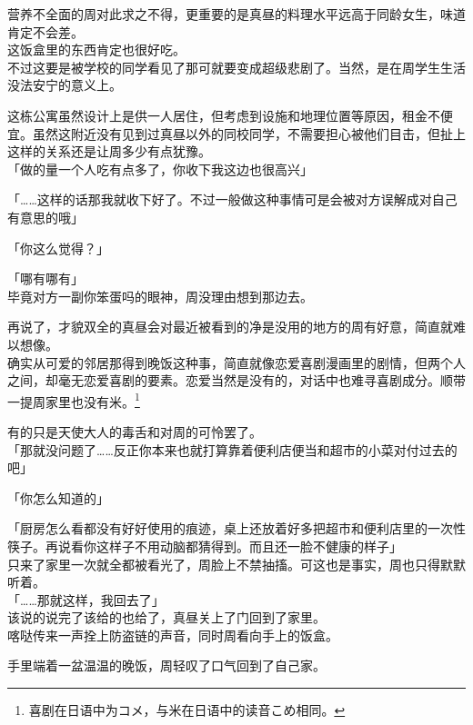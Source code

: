 营养不全面的周对此求之不得，更重要的是真昼的料理水平远高于同龄女生，味道肯定不会差。\\

这饭盒里的东西肯定也很好吃。\\

不过这要是被学校的同学看见了那可就要变成超级悲剧了。当然，是在周学生生活没法安宁的意义上。

这栋公寓虽然设计上是供一人居住，但考虑到设施和地理位置等原因，租金不便宜。虽然这附近没有见到过真昼以外的同校同学，不需要担心被他们目击，但扯上这样的关系还是让周多少有点犹豫。\\

「做的量一个人吃有点多了，你收下我这边也很高兴」

「……这样的话那我就收下好了。不过一般做这种事情可是会被对方误解成对自己有意思的哦」

「你这么觉得？」

「哪有哪有」\\

毕竟对方一副你笨蛋吗的眼神，周没理由想到那边去。

再说了，才貌双全的真昼会对最近被看到的净是没用的地方的周有好意，简直就难以想像。\\

确实从可爱的邻居那得到晚饭这种事，简直就像恋爱喜剧漫画里的剧情，但两个人之间，却毫无恋爱喜剧的要素。恋爱当然是没有的，对话中也难寻喜剧成分。顺带一提周家里也没有米。\footnote{喜剧在日语中为{\jpfont コメ}，与米在日语中的读音{\jpfont こめ}相同。}

有的只是天使大人的毒舌和对周的可怜罢了。\\

「那就没问题了……反正你本来也就打算靠着便利店便当和超市的小菜对付过去的吧」

「你怎么知道的」

「厨房怎么看都没有好好使用的痕迹，桌上还放着好多把超市和便利店里的一次性筷子。再说看你这样子不用动脑都猜得到。而且还一脸不健康的样子」\\

只来了家里一次就全都被看光了，周脸上不禁抽搐。可这也是事实，周也只得默默听着。\\

「……那就这样，我回去了」\\

该说的说完了该给的也给了，真昼关上了门回到了家里。\\

喀哒传来一声拴上防盗链的声音，同时周看向手上的饭盒。

手里端着一盆温温的晚饭，周轻叹了口气回到了自己家。\\

